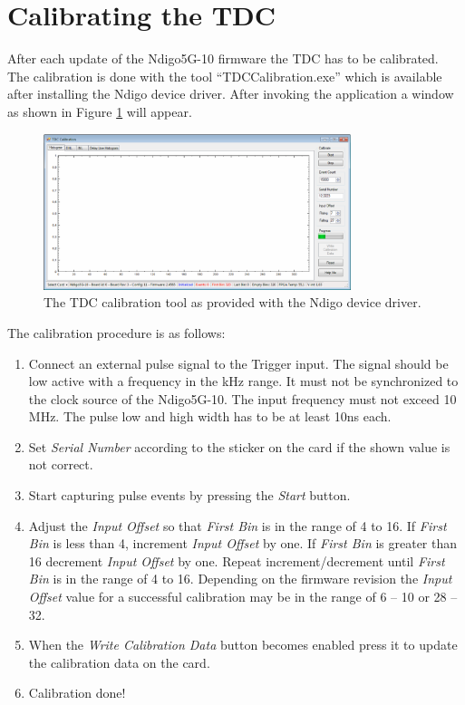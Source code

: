    \section{Calibrating the TDC}
    
        After each update of the Ndigo5G-10 firmware the TDC has to be calibrated. The calibration is done with the tool ``TDC\tu Calibration.exe'' which is available after installing the Ndigo device driver. After invoking the application a window as shown in Figure \ref{fig:Calib} will appear.\par

        \begin{figure}[ht]
            \begin{center}
                \includegraphics[width=0.8\textwidth]{figures/Calib.pdf}
                \caption{\label{fig:Calib}The TDC calibration tool as provided with the Ndigo device driver.}
            \end{center}
        \end{figure}
        
        The calibration procedure is as follows:
        
        \begin{enumerate}
            \item Connect an external pulse signal to the Trigger input. The signal should be low active with a frequency in the kHz range. It must not be synchronized to the clock source of the Ndigo5G-10. The input frequency must not exceed 10 MHz. The pulse low and high width has to be at least 10ns each.
            \item Set \textit{Serial Number} according to the sticker on the card if the shown value is not correct.
            \item Start capturing pulse events by pressing the \textit{Start} button.
            \item Adjust the \textit{Input Offset} so that \textit{First Bin} is in the range of 4 to 16. If \textit{First Bin} is less than 4, increment \textit{Input Offset} by one. If \textit{First Bin} is greater than 16 decrement \textit{Input Offset} by one. Repeat increment/decrement until \textit{First Bin} is in the range of 4 to 16. Depending on the firmware revision the \textit{Input Offset} value for a successful calibration may be in the range of 6 – 10 or 28 – 32.
            \item When the \textit{Write Calibration Data} button becomes enabled press it to update the calibration data on the card.
            \item Calibration done!
        \end{enumerate}
        
